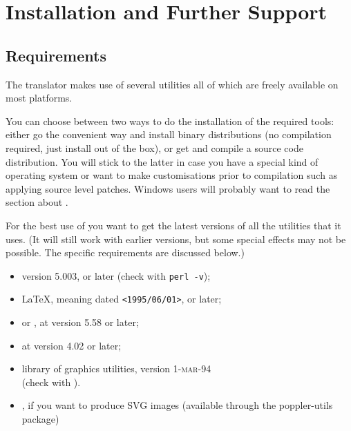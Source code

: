 \section{Installation and Further Support}
\label{sec:sup}
\subsection{Requirements}%
\html{\\}%
The translator makes use of several utilities all of which 
are freely available on most platforms. 

You can choose between two ways to do the installation of the required
tools: either go the convenient way and install binary distributions
(no compilation required, just install out of the box), or get and
compile a source code distribution.
You will stick to the latter in case you have a special kind of
operating system or want to make customisations prior to compilation
such as applying source level patches.
Windows users will probably want to read the section about
.

For the best use of \latextohtml{} you want to get the latest
versions of all the utilities that it uses. (It will still work
with earlier versions, but some  special effects may not be possible. 
The specific requirements are discussed below.)
%
\begin{itemize}
\item \Perl{} version 5.003, or later (check with \verb/perl -v/);
\item \LaTeX, meaning \LaTeXe{} dated \texttt{<1995/06/01>}, or later;
\item {} or , at version 5.58 or later;
\item {} at version 4.02 or later;
\item {} library of graphics utilities, version \textsc{1-mar-94}\\
  (check with  ).
\item {}, if you want to produce SVG images
      (available through the poppler-utils package)
\end{itemize}

